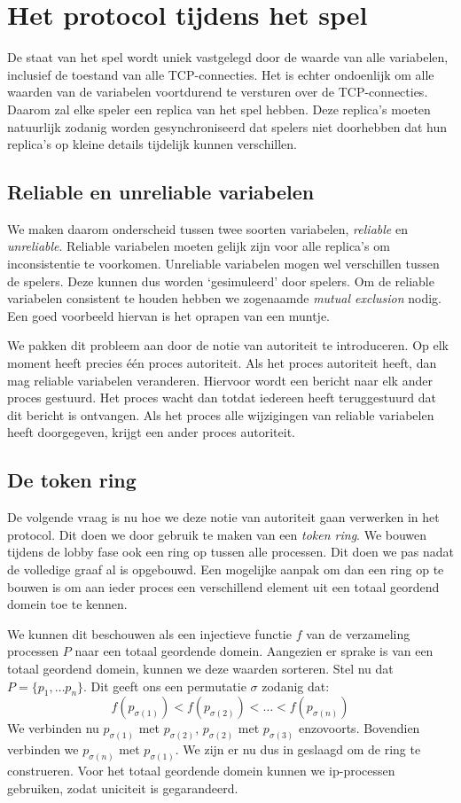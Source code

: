 \documentclass[a4paper,11pt]{article}
\begin{document}
    \section{Het protocol tijdens het spel}
    De staat van het spel wordt uniek vastgelegd door de waarde van alle variabelen, inclusief de toestand van alle TCP-connecties. Het is echter ondoenlijk om alle waarden van de variabelen voortdurend te versturen over de TCP-connecties. Daarom zal elke speler een replica van het spel hebben. Deze replica's moeten natuurlijk zodanig worden gesynchroniseerd dat spelers niet doorhebben dat hun replica's op kleine details tijdelijk kunnen verschillen.
    
    \subsection{Reliable en unreliable variabelen}
    We maken daarom onderscheid tussen twee soorten variabelen, \emph{reliable} en \emph{unreliable}. Reliable variabelen moeten gelijk zijn voor alle replica's om inconsistentie te voorkomen. Unreliable variabelen mogen wel verschillen tussen de spelers. Deze kunnen dus worden `gesimuleerd' door spelers. Om de reliable variabelen consistent te houden hebben we zogenaamde \emph{mutual exclusion} nodig. Een goed voorbeeld hiervan is het oprapen van een muntje.
    
    We pakken dit probleem aan door de notie van autoriteit te introduceren. Op elk moment heeft precies \'e\'en proces autoriteit. Als het proces autoriteit heeft, dan mag reliable variabelen veranderen. Hiervoor wordt een bericht naar elk ander proces gestuurd. Het proces wacht dan totdat iedereen heeft teruggestuurd dat dit bericht is ontvangen. Als het proces alle wijzigingen van reliable variabelen heeft doorgegeven, krijgt een ander proces autoriteit.
    
    \subsection{De token ring}
    De volgende vraag is nu hoe we deze notie van autoriteit gaan verwerken in het protocol. Dit doen we door gebruik te maken van een \emph{token ring}. We bouwen tijdens de lobby fase ook een ring op tussen alle processen. Dit doen we pas nadat de volledige graaf al is opgebouwd. Een mogelijke aanpak om dan een ring op te bouwen is om aan ieder proces een verschillend element uit een totaal geordend domein toe te kennen. 
    
    We kunnen dit beschouwen als een injectieve functie $f$ van de verzameling processen $P$ naar een totaal geordende domein. Aangezien er sprake is van een totaal geordend domein, kunnen we deze waarden sorteren. Stel nu dat $P = \{ p_1, \ldots p_n\}$. Dit geeft ons een permutatie $\sigma$ zodanig dat:
    \[
    f(p_{\sigma(1)}) < f(p_{\sigma(2)}) < \ldots < f(p_{\sigma(n)})
    \]
    We verbinden nu $p_{\sigma(1)}$ met $p_{\sigma(2)}$, $p_{\sigma(2)}$ met $p_{\sigma(3)}$ enzovoorts. Bovendien verbinden we $p_{\sigma(n)}$ met $p_{\sigma(1)}$. We zijn er nu dus in geslaagd om de ring te construeren. Voor het totaal geordende domein kunnen we ip-processen gebruiken, zodat uniciteit is gegarandeerd.
    
\end{document}
